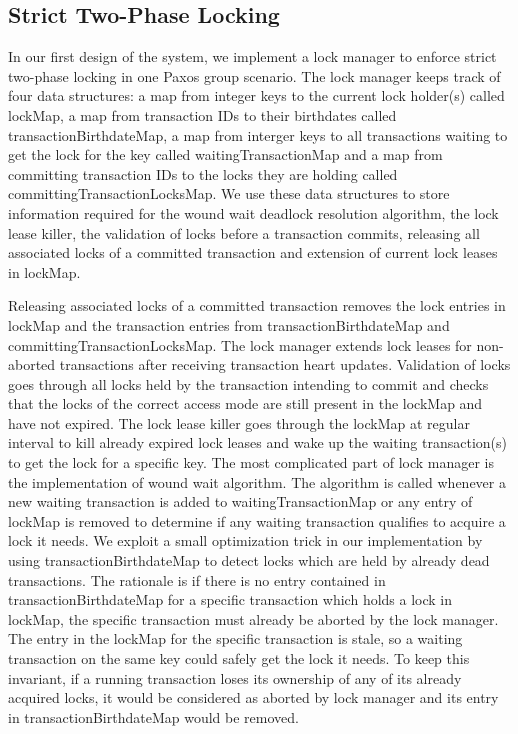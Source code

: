 \documentclass[10pt,twocolumn]{article}
\begin{document}
\subsection{Strict Two-Phase Locking}
In our first design of the system, we implement a lock manager to enforce strict two-phase locking in one Paxos group scenario. The lock manager keeps track of four data structures: a map from integer keys to the current lock holder(s) called lockMap, a map from transaction IDs to their birthdates called transactionBirthdateMap, a map from interger keys to all transactions waiting to get the lock for the key called waitingTransactionMap and a map from committing transaction IDs to the locks they are holding called committingTransactionLocksMap. We use these data structures to store information required for the wound wait deadlock resolution algorithm,  the lock lease killer, the validation of locks before a transaction commits, releasing all associated locks of a committed transaction and extension of current lock leases in lockMap. 

Releasing associated locks of a committed transaction removes the lock entries in lockMap and the transaction entries from transactionBirthdateMap and committingTransactionLocksMap. The lock manager extends lock leases for non-aborted transactions after receiving transaction heart updates. Validation of locks goes through all locks held by the transaction intending to commit and checks that the locks of the correct access mode are still present in the lockMap and have not expired. The lock lease killer goes through the lockMap at regular interval to kill already expired lock leases and wake up the waiting transaction(s) to get the lock for a specific key. The most complicated part of lock manager is the implementation of wound wait algorithm. The algorithm is called whenever a new waiting transaction is added to waitingTransactionMap or any entry of lockMap is removed to determine if any waiting transaction qualifies to acquire a lock it needs. We exploit a small optimization trick in our implementation by using transactionBirthdateMap to detect locks which are held by already dead transactions. The rationale is if there is no entry contained in transactionBirthdateMap for a specific transaction which holds a lock in lockMap, the specific transaction must already be aborted by the lock manager. The entry in the lockMap for the specific transaction is stale, so a waiting transaction on the same key could safely get the lock it needs. To keep this invariant, if a running transaction loses its ownership of any of its already acquired locks, it would be considered as aborted by lock manager and its entry in transactionBirthdateMap would be removed.
\end{document}
